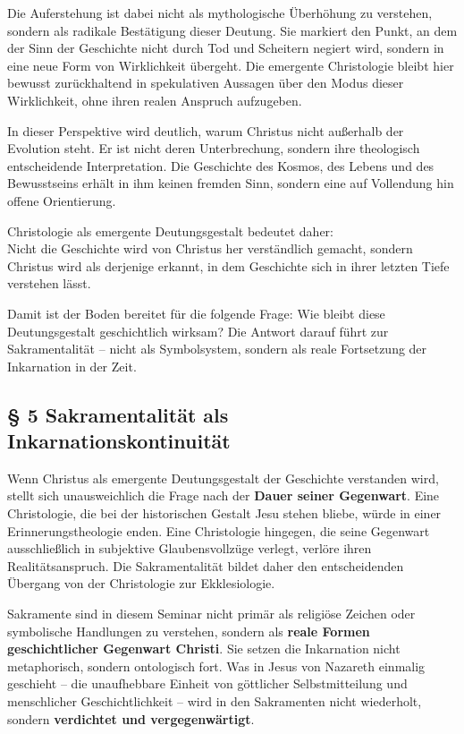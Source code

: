 \documentclass[
]{article}
\begin{document}
Die Auferstehung ist dabei nicht als mythologische Überhöhung zu verstehen, sondern als radikale Bestätigung dieser Deutung. Sie markiert den Punkt, an dem der Sinn der Geschichte nicht durch Tod und Scheitern negiert wird, sondern in eine neue Form von Wirklichkeit übergeht. Die emergente Christologie bleibt hier bewusst zurückhaltend in spekulativen Aussagen über den Modus dieser Wirklichkeit, ohne ihren realen Anspruch aufzugeben.

In dieser Perspektive wird deutlich, warum Christus nicht außerhalb der Evolution steht. Er ist nicht deren Unterbrechung, sondern ihre theologisch entscheidende Interpretation. Die Geschichte des Kosmos, des Lebens und des Bewusstseins erhält in ihm keinen fremden Sinn, sondern eine auf Vollendung hin offene Orientierung.

Christologie als emergente Deutungsgestalt bedeutet daher:\\
Nicht die Geschichte wird von Christus her verständlich gemacht, sondern Christus wird als derjenige erkannt, in dem Geschichte sich in ihrer letzten Tiefe verstehen lässt.

Damit ist der Boden bereitet für die folgende Frage: Wie bleibt diese Deutungsgestalt geschichtlich wirksam? Die Antwort darauf führt zur Sakramentalität -- nicht als Symbolsystem, sondern als reale Fortsetzung der Inkarnation in der Zeit.

\subsection{\texorpdfstring{\textbf{§ 5 Sakramentalität als Inkarnationskontinuität}}{§ 5 Sakramentalität als Inkarnationskontinuität}}\label{sakramentalituxe4t-als-inkarnationskontinuituxe4t}

Wenn Christus als emergente Deutungsgestalt der Geschichte verstanden wird, stellt sich unausweichlich die Frage nach der \textbf{Dauer seiner Gegenwart}. Eine Christologie, die bei der historischen Gestalt Jesu stehen bliebe, würde in einer Erinnerungstheologie enden. Eine Christologie hingegen, die seine Gegenwart ausschließlich in subjektive Glaubensvollzüge verlegt, verlöre ihren Realitätsanspruch. Die Sakramentalität bildet daher den entscheidenden Übergang von der Christologie zur Ekklesiologie.

Sakramente sind in diesem Seminar nicht primär als religiöse Zeichen oder symbolische Handlungen zu verstehen, sondern als \textbf{reale Formen geschichtlicher Gegenwart Christi}. Sie setzen die Inkarnation nicht metaphorisch, sondern ontologisch fort. Was in Jesus von Nazareth einmalig geschieht -- die unaufhebbare Einheit von göttlicher Selbstmitteilung und menschlicher Geschichtlichkeit -- wird in den Sakramenten nicht wiederholt, sondern \textbf{verdichtet und vergegenwärtigt}.
\end{document}
